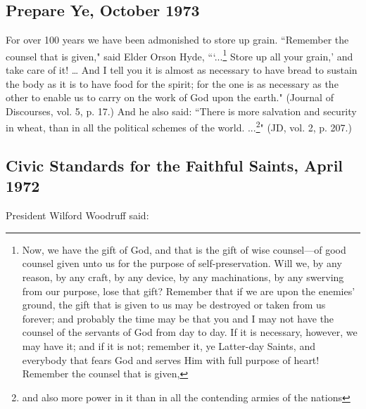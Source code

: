 \subsection{Prepare Ye, October 1973}

For over 100 years we have been admonished to store up grain. ``Remember the counsel that is given," said Elder Orson Hyde, ```...\footnote{Now, we have the gift of God, and that is the gift of wise counsel—of good counsel given unto us for the purpose of self-preservation. Will we, by any reason, by any craft, by any device, by any machinations, by any swerving from our purpose, lose that gift? Remember that if we are upon the enemies' ground, the gift that is given to us may be destroyed or taken from us forever; and probably the time may be that you and I may not have the counsel of the servants of God from day to day. If it is necessary, however, we may have it; and if it is not; remember it, ye Latter-day Saints, and everybody that fears God and serves Him with full purpose of heart! Remember the counsel that is given,} Store up all your grain,' and take care of it! … And I tell you it is almost as necessary to have bread to sustain the body as it is to have food for the spirit; for the one is as necessary as the other to enable us to carry on the work of God upon the earth." (Journal of Discourses, vol. 5, p. 17.) And he also said: ``There is more salvation and security in wheat, than in all the political schemes of the world. ...\footnote{and also more power in it than in all the contending armies of the nations}" (JD, vol. 2, p. 207.)

\subsection{Civic Standards for the Faithful Saints, April 1972}

President Wilford Woodruff said:

